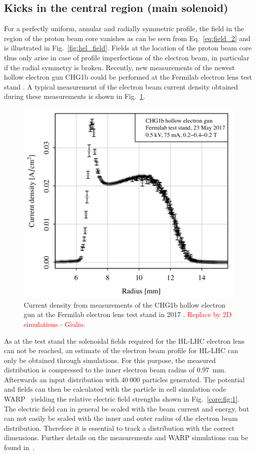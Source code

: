 \documentclass[%
 reprint,
 amsmath,amssymb,
 aps,
prstab,
]{revtex4-1}
\begin{document}
\subsection{Kicks in the central region (main solenoid)}
\label{core:sec:2}
For a perfectly uniform, annular and radially symmetric profile, the field in the region of the proton beam core vanishes as can be seen from Eq.~\ref{eq:field_2} and is illustrated in Fig.~\ref{fig:hel_field}. Fields at the location of the proton beam core thus only arise in case of profile imperfections of the electron beam, in particular if the radial symmetry is broken. Recently, new measurements of the newest hollow electron gun CHG1b could be performed at the Fermilab electron lens test stand \cite{hel_test_stand_fnal}. A typical measurement of the electron beam current density obtained during these measurements is shown in Fig.~\ref{core:fig:0}.
\begin{figure}[t]
		\centering
		\includegraphics[width=0.8\linewidth]{e-field-measured.png}
	\caption{Current density from measurements of the CHG1b hollow electron gun at the Fermilab electron lens test stand in 2017 \cite{hel_res_field_stancari_2017}. \textcolor{red}{Replace by 2D simulations - Giulio.}}
	\label{core:fig:0}
\end{figure}
As at the test stand the solenoidal fields required for the HL-LHC electron lens can not be reached, an estimate of the electron beam profile for HL-LHC can only be obtained through simulations. For this purpose, the measured distribution is compressed to the inner electron beam radius of $0.97$~mm. Afterwards an input distribution with $40\ 000$ particles generated. The potential and fields can then be calculated with the particle in cell simulation code WARP~\cite{warp} yielding the relative electric field strengths shown in Fig.~\ref{core:fig:1}. The electric field can in general be scaled with the beam current and energy, but can not easily be scaled with the inner and outer radius of the electron beam distribution. Therefore it is essential to track a distribution with the correct dimensions. Further details on the measurements and WARP simulations can be found in~\cite{hel_res_field_stancari_2017}.
\end{document}
